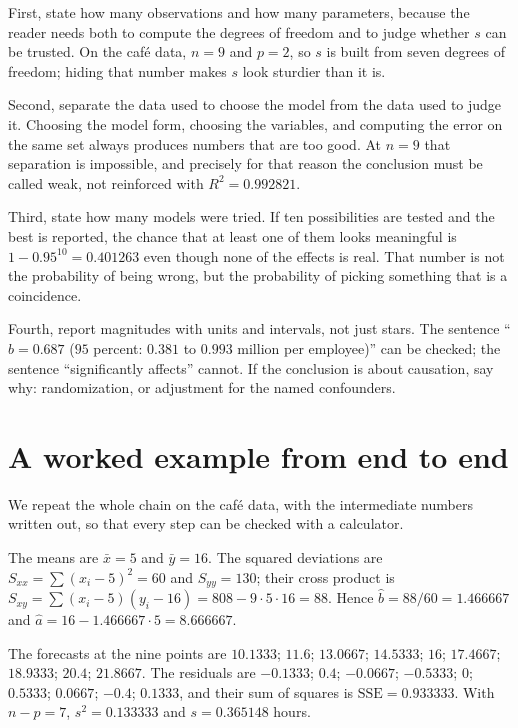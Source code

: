 First, state how many observations and how many parameters, because the reader needs both to
compute the degrees of freedom and to judge whether $s$ can be trusted. On the café data, $n=9$
and $p=2$, so $s$ is built from seven degrees of freedom; hiding that number makes $s$ look
sturdier than it is.

Second, separate the data used to choose the model from the data used to judge it. Choosing the
model form, choosing the variables, and computing the error on the same set always produces
numbers that are too good. At $n=9$ that separation is impossible, and precisely for that reason
the conclusion must be called weak, not reinforced with $R^2=0.992821$.

Third, state how many models were tried. If ten possibilities are tested and the best is
reported, the chance that at least one of them looks meaningful is $1-0.95^{10}=0.401263$ even
though none of the effects is real. That number is not the probability of being wrong, but the
probability of picking something that is a coincidence.

Fourth, report magnitudes with units and intervals, not just stars. The sentence
``$\hat b=0.687$ ($95$ percent: $0.381$ to $0.993$ million per employee)'' can be checked; the
sentence ``significantly affects'' cannot. If the conclusion is about causation, say why:
randomization, or adjustment for the named confounders.

\section{A worked example from end to end}

We repeat the whole chain on the café data, with the intermediate numbers written out, so that
every step can be checked with a calculator.

The means are $\bar x=5$ and $\bar y=16$. The squared deviations are
$S_{xx}=\sum(x_i-5)^2=60$ and $S_{yy}=130$; their cross product is
$S_{xy}=\sum(x_i-5)(y_i-16)=808-9\cdot5\cdot16=88$. Hence $\hat b=88/60=1.466667$ and
$\hat a=16-1.466667\cdot5=8.666667$.

The forecasts at the nine points are $10.1333$; $11.6$; $13.0667$; $14.5333$; $16$; $17.4667$;
$18.9333$; $20.4$; $21.8667$. The residuals are $-0.1333$; $0.4$; $-0.0667$; $-0.5333$; $0$;
$0.5333$; $0.0667$; $-0.4$; $0.1333$, and their sum of squares is $\mathrm{SSE}=0.933333$. With
$n-p=7$, $s^2=0.133333$ and $s=0.365148$ hours.

